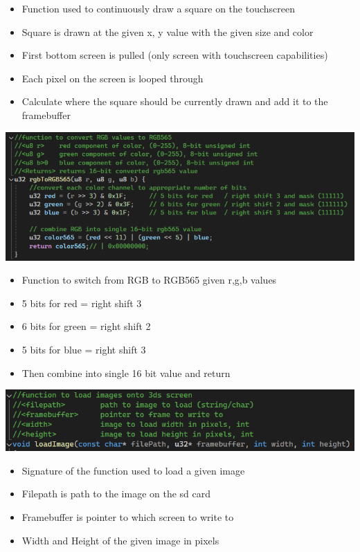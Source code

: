 \documentclass{article}
\begin{document}
    \begin{itemize}
        \item Function used to continuously draw a square on the touchscreen
        \item Square is drawn at the given x, y value with the given size and color
        \item First bottom screen is pulled (only screen with touchscreen capabilities)
        \item Each pixel on the screen is looped through
        \item Calculate where the square should be currently drawn and add it to the framebuffer
    \end{itemize}
\includegraphics[width=0.75\linewidth]{image7.png}
    \begin{itemize}
        \item Function to switch from RGB to RGB565 given r,g,b values
        \item 5 bits for red = right shift 3
        \item 6 bits for green = right shift 2
        \item 5 bits for blue = right shift 3
        \item Then combine into single 16 bit value and return
    \end{itemize}
\includegraphics[width=0.75\linewidth]{image4.png}    %
    \begin{itemize}
        \item Signature of the function used to load a given image
        \item Filepath is path to the image on the sd card
        \item Framebuffer is pointer to which screen to write to
        \item Width and Height of the given image in pixels
    \end{itemize}
\end{document}
